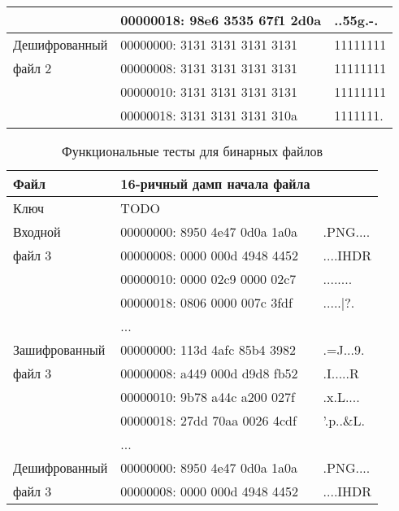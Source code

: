 \begin{table}[ht!]
\begin{center}
\begin{tabular}{|l|ll|}
                          & 00000018: 98e6 3535 67f1 2d0a & ..55g.-. \\
            \hline
            Дешифрованный & 00000000: 3131 3131 3131 3131 & 11111111 \\
            файл 2        & 00000008: 3131 3131 3131 3131 & 11111111 \\
                          & 00000010: 3131 3131 3131 3131 & 11111111 \\
                          & 00000018: 3131 3131 3131 310a & 1111111. \\
            \hline
		\end{tabular}
	\end{center}
\end{table}

\begin{table}[ht!]
    \begin{center}
        \caption{Функциональные тесты для бинарных файлов}
        \label{}
        \begin{tabular}{|l|ll|}
            \hline
            Файл & 16-ричный дамп начала файла & \\
			\hline
            \hline
            Ключ          & TODO & \\
            \hline
            Входной       & 00000000: 8950 4e47 0d0a 1a0a & .PNG.... \\
            файл 3        & 00000008: 0000 000d 4948 4452 & ....IHDR \\
                          & 00000010: 0000 02c9 0000 02c7 & ........ \\
                          & 00000018: 0806 0000 007c 3fdf & .....|?. \\
                          & ... & \\
            \hline
            Зашифрованный & 00000000: 113d 4afc 85b4 3982 & .=J...9. \\
            файл 3        & 00000008: a449 000d d9d8 fb52 & .I.....R \\
                          & 00000010: 9b78 a44c a200 027f & .x.L.... \\
                          & 00000018: 27dd 70aa 0026 4cdf & '.p..\&L. \\
                          & ... & \\
            \hline
            Дешифрованный & 00000000: 8950 4e47 0d0a 1a0a & .PNG.... \\
            файл 3        & 00000008: 0000 000d 4948 4452 & ....IHDR \\

\end{tabular}
\end{center}
\end{table}
